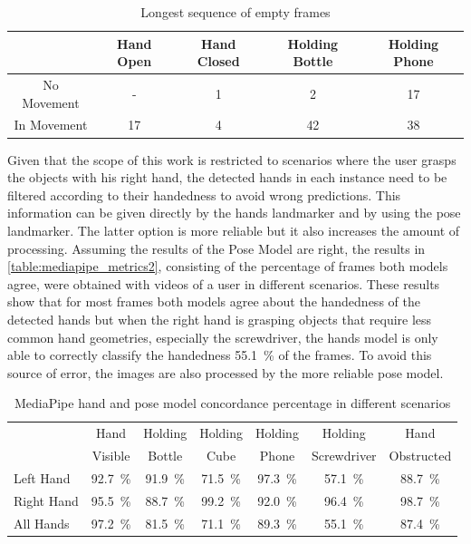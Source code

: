 \begin{table}[ht]
    \centering
    \caption{Longest sequence of empty frames}
    \label{table:mediapipe_metrics4}
    \begin{tabular}{ccccc}
        \toprule
        & Hand Open & Hand Closed & Holding Bottle & Holding Phone \\
        \midrule
        No Movement & - & 1 & 2 & 17 \\
        In Movement & 17 & 4 & 42 & 38 \\
        \bottomrule
    \end{tabular}
\end{table}

Given that the scope of this work is restricted to scenarios where the user grasps the objects with his right hand, the detected hands in each instance need to be filtered according to their handedness to avoid wrong predictions. This information can be given directly by the hands landmarker and by using the pose landmarker. The latter option is more reliable but it also increases the amount of processing. Assuming the results of the Pose Model are right, the results in \autoref{table:mediapipe_metrics2}, consisting of the percentage of frames both models agree, were obtained with videos of a user in different scenarios. These results show that for most frames both models agree about the handedness of the detected hands but when the right hand is grasping objects that require less common hand geometries, especially the screwdriver, the hands model is only able to correctly classify the handedness \SI{55.1}{\percent} of the frames. To avoid this source of error, the images are also processed by the more reliable pose model.

\begin{table}[ht]
    \centering
    \caption{MediaPipe hand and pose model concordance percentage in different scenarios}
    \label{table:mediapipe_metrics2}
    \begin{tabular}{lcccccc}
        \toprule
        & Hand\multirow{2}{*}{} & Holding\multirow{2}{*}{} & Holding\multirow{2}{*}{} & Holding\multirow{2}{*}{} & Holding\multirow{2}{*}{} & Hand\multirow{2}{*}{} \\
        & Visible & Bottle & Cube & Phone & Screwdriver & Obstructed \\
        \midrule
        Left Hand & \SI{92.7}{\percent} & \SI{91.9}{\percent} & \SI{71.5}{\percent} & \SI{97.3}{\percent} & \SI{57.1}{\percent} & \SI{88.7}{\percent} \\
        Right Hand & \SI{95.5}{\percent} & \SI{88.7}{\percent} & \SI{99.2}{\percent} & \SI{92.0}{\percent} & \SI{96.4}{\percent} & \SI{98.7}{\percent} \\
        All Hands & \SI{97.2}{\percent} & \SI{81.5}{\percent} & \SI{71.1}{\percent} & \SI{89.3}{\percent} & \SI{55.1}{\percent} & \SI{87.4}{\percent} \\
        \bottomrule
    \end{tabular}
\end{table}

